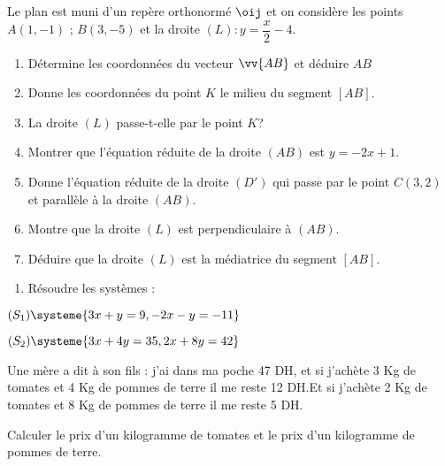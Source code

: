 \documentclass[a4paper,12pt]{article}
\begin{document}
\devoir[sem=2,prv=true,ds=true,num=2 ,niv=3 ,date=27/04/2023]

\begin{exo}[14]
Le plan est muni d'un repère orthonormé $\oij$ et on considère les points $A(1,-1)$ ; $B(3,-5)$ et la droite $(L):y=\dfrac{x}{2}-4$.
\begin{enumerate}
\item Détermine les coordonnées du vecteur $\vv{AB}$ et déduire $AB$\newline
\anserline[2]
\item Donne les coordonnées du point $K$ le milieu du segment $[AB]$.\newline
\anserline[2]
\item La droite $(L)$ passe-t-elle par le point $K$?
\newline
\anserline[2]
\item Montrer que l'équation réduite de la droite $(AB)$ est $y=-2x+1$.
\newline
\anserline[4]
\item Donne l'équation réduite de la droite $(D')$ qui passe par le point $C(3,2)$ et parallèle à la droite $(AB)$.
\newline\anserline[4]
\item Montre que la droite $(L)$ est perpendiculaire à $(AB)$.\newline\anserline[4]
\item Déduire que la droite $(L)$ est la médiatrice du segment $[AB]$.\newline\anserline[3]
\end{enumerate}
\end{exo}

\begin{exo}[6]
\begin{enumerate}
\item Résoudre les systèmes :
\end{enumerate}
\begin{multicols}{2}
$(S_1)\systeme{3x+y=9,-2x-y=-11}$\newline
\anserline[8]
\columnbreak

$(S_2)\systeme{3x+4y=35,2x+8y=42}$\newline
\anserline[8]
\end{multicols}
\end{exo}

\begin{exo}[2]
Une mère a dit à son fils : j'ai dans ma poche 47 DH, et si j'achète 3 Kg de tomates et 4 Kg de pommes de terre il me reste 12 DH.Et si j'achète 2 Kg de tomates et 8 Kg de pommes de terre il me reste 5 DH.

Calculer le prix d'un kilogramme de tomates et le prix d'un kilogramme de pommes de terre.
\end{exo}
\end{document}
